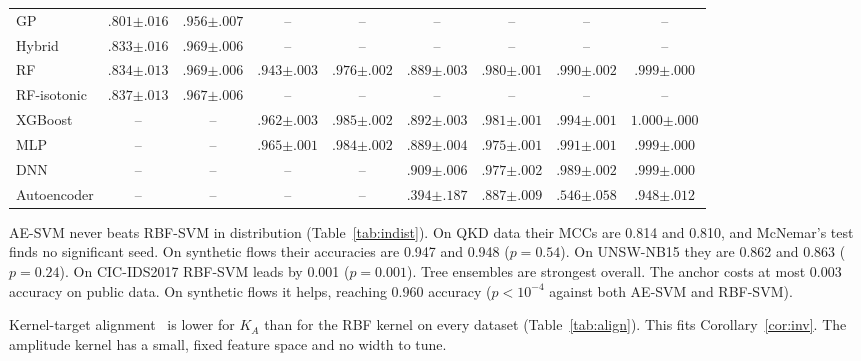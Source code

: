 \documentclass[pdflatex,sn-mathphys-num,lineno]{sn-jnl}
\theoremstyle{thmstyleone}
\begin{document}
\begin{table}
\begin{tabular}{lcccccccc}
    GP & $.801{\scriptstyle\pm.016}$ & $.956{\scriptstyle\pm.007}$ & -- & -- & -- & -- & -- & -- \\
    Hybrid & $.833{\scriptstyle\pm.016}$ & $.969{\scriptstyle\pm.006}$ & -- & -- & -- & -- & -- & -- \\
    RF & $.834{\scriptstyle\pm.013}$ & $.969{\scriptstyle\pm.006}$ & $.943{\scriptstyle\pm.003}$ & $.976{\scriptstyle\pm.002}$ & $.889{\scriptstyle\pm.003}$ & $.980{\scriptstyle\pm.001}$ & $.990{\scriptstyle\pm.002}$ & $\mathbf{.999{\scriptstyle\pm.000}}$ \\
    RF-isotonic & $\mathbf{.837{\scriptstyle\pm.013}}$ & $.967{\scriptstyle\pm.006}$ & -- & -- & -- & -- & -- & -- \\
    XGBoost & -- & -- & $.962{\scriptstyle\pm.003}$ & $\mathbf{.985{\scriptstyle\pm.002}}$ & $.892{\scriptstyle\pm.003}$ & $\mathbf{.981{\scriptstyle\pm.001}}$ & $\mathbf{.994{\scriptstyle\pm.001}}$ & $\mathbf{1.000{\scriptstyle\pm.000}}$ \\
    MLP & -- & -- & $\mathbf{.965{\scriptstyle\pm.001}}$ & $.984{\scriptstyle\pm.002}$ & $.889{\scriptstyle\pm.004}$ & $.975{\scriptstyle\pm.001}$ & $.991{\scriptstyle\pm.001}$ & $\mathbf{.999{\scriptstyle\pm.000}}$ \\
    DNN & -- & -- & -- & -- & $\mathbf{.909{\scriptstyle\pm.006}}$ & $.977{\scriptstyle\pm.002}$ & $.989{\scriptstyle\pm.002}$ & $\mathbf{.999{\scriptstyle\pm.000}}$ \\
    Autoencoder & -- & -- & -- & -- & $.394{\scriptstyle\pm.187}$ & $.887{\scriptstyle\pm.009}$ & $.546{\scriptstyle\pm.058}$ & $.948{\scriptstyle\pm.012}$ \\
    \bottomrule
  \end{tabular}
\end{table}

AE-SVM never beats RBF-SVM in distribution (Table~\ref{tab:indist}). On QKD data
their MCCs are 0.814 and 0.810, and McNemar's test finds no significant seed. On
synthetic flows their accuracies are 0.947 and 0.948 ($p=0.54$). On UNSW-NB15 they
are 0.862 and 0.863 ($p=0.24$). On CIC-IDS2017 RBF-SVM leads by 0.001
($p=0.001$). Tree ensembles are strongest overall. The anchor costs at most 0.003
accuracy on public data. On synthetic flows it helps, reaching 0.960 accuracy
($p<10^{-4}$ against both AE-SVM and RBF-SVM).

Kernel-target alignment~\cite{cristianini2002kernel} is lower for $K_A$ than for
the RBF kernel on every dataset (Table~\ref{tab:align}). This fits
Corollary~\ref{cor:inv}. The amplitude kernel has a small, fixed feature space and
no width to tune.
\end{document}
